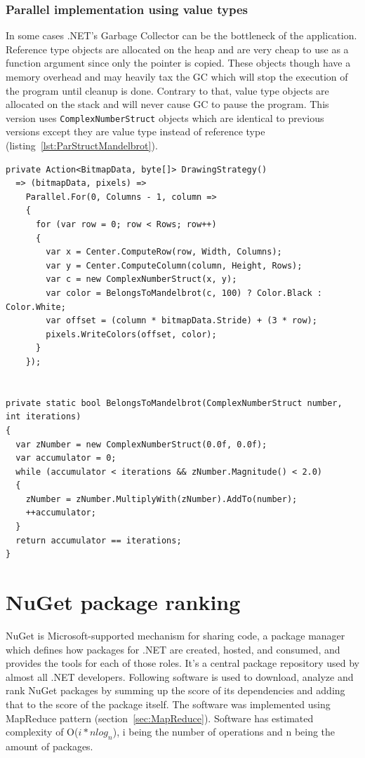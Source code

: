 \subsubsection{Parallel implementation using value types}

In some cases .NET's Garbage Collector can be the bottleneck of the application. Reference type objects are allocated on the heap and are very cheap to use as a function argument since only the pointer is copied. These objects though have a memory overhead and may heavily tax the GC which will stop the execution of the program until cleanup is done. Contrary to that, value type objects are allocated on the stack and will never cause GC to pause the program. This version uses \texttt{ComplexNumberStruct} objects which are identical to previous versions except they are value type instead of reference type (listing~\ref{lst:ParStructMandelbrot}).

\begin{lstlisting}[style=sharpcstyle, caption={Parallel \texttt{Mandelbrot} algorithm using value types}, label={lst:ParStructMandelbrot},
numbers=none, xleftmargin=0pt,framexleftmargin=0pt,framexrightmargin=0pt,framexbottommargin=0pt]
private Action<BitmapData, byte[]> DrawingStrategy()
  => (bitmapData, pixels) =>
    Parallel.For(0, Columns - 1, column =>
    {
      for (var row = 0; row < Rows; row++)
      {
        var x = Center.ComputeRow(row, Width, Columns);
        var y = Center.ComputeColumn(column, Height, Rows);
        var c = new ComplexNumberStruct(x, y);
        var color = BelongsToMandelbrot(c, 100) ? Color.Black : Color.White;
        var offset = (column * bitmapData.Stride) + (3 * row);
        pixels.WriteColors(offset, color);
      }
    });


private static bool BelongsToMandelbrot(ComplexNumberStruct number, int iterations)
{
  var zNumber = new ComplexNumberStruct(0.0f, 0.0f);
  var accumulator = 0;
  while (accumulator < iterations && zNumber.Magnitude() < 2.0)
  {
    zNumber = zNumber.MultiplyWith(zNumber).AddTo(number);
    ++accumulator;
  }
  return accumulator == iterations;
}

\end{lstlisting}


\section{NuGet package ranking} 
\label{sec: NuGetImp}
NuGet is Microsoft-supported mechanism for sharing code, a package manager which defines how packages for .NET are created, hosted, and consumed, and provides the tools for each of those roles. It's a central package repository used by almost all .NET developers. Following software is used to download, analyze and rank NuGet packages by summing up the score of its dependencies and adding that to the score of the package itself. The software was implemented using MapReduce pattern (section~\ref{sec:MapReduce}). Software has estimated complexity of O($i*nlog_n$), i being the number of operations and n being the amount of packages. 

